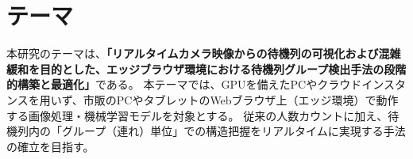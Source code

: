 \section{テーマ}

本研究のテーマは、\textbf{「リアルタイムカメラ映像からの待機列の可視化および混雑緩和を目的とした、エッジブラウザ環境における待機列グループ検出手法の段階的構築と最適化」}である。
本テーマでは、GPUを備えたPCやクラウドインスタンスを用いず、市販のPCやタブレットのWebブラウザ上（エッジ環境）で動作する画像処理・機械学習モデルを対象とする。
従来の人数カウントに加え、待機列内の「グループ（連れ）単位」での構造把握をリアルタイムに実現する手法の確立を目指す。
